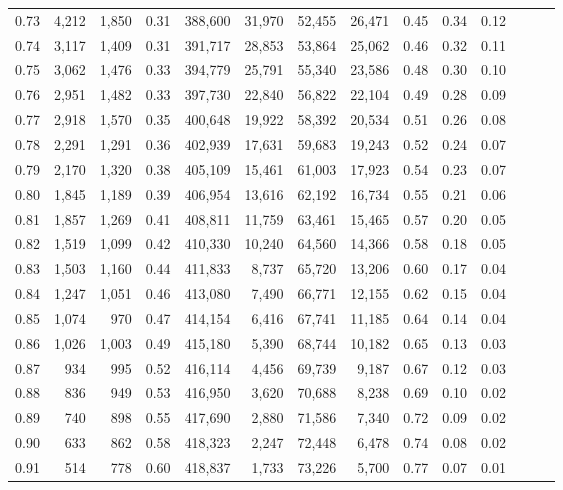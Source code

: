 \begin{tabular}{rrrrrrrrrrrrrr}
0.73 &  4,212 &  1,850 &  0.31 &  388,600 &   31,970 &  52,455 &  26,471 &  0.45 &  0.34 &      0.12 \\
0.74 &  3,117 &  1,409 &  0.31 &  391,717 &   28,853 &  53,864 &  25,062 &  0.46 &  0.32 &      0.11 \\
0.75 &  3,062 &  1,476 &  0.33 &  394,779 &   25,791 &  55,340 &  23,586 &  0.48 &  0.30 &      0.10 \\
0.76 &  2,951 &  1,482 &  0.33 &  397,730 &   22,840 &  56,822 &  22,104 &  0.49 &  0.28 &      0.09 \\
0.77 &  2,918 &  1,570 &  0.35 &  400,648 &   19,922 &  58,392 &  20,534 &  0.51 &  0.26 &      0.08 \\
0.78 &  2,291 &  1,291 &  0.36 &  402,939 &   17,631 &  59,683 &  19,243 &  0.52 &  0.24 &      0.07 \\
0.79 &  2,170 &  1,320 &  0.38 &  405,109 &   15,461 &  61,003 &  17,923 &  0.54 &  0.23 &      0.07 \\
0.80 &  1,845 &  1,189 &  0.39 &  406,954 &   13,616 &  62,192 &  16,734 &  0.55 &  0.21 &      0.06 \\
0.81 &  1,857 &  1,269 &  0.41 &  408,811 &   11,759 &  63,461 &  15,465 &  0.57 &  0.20 &      0.05 \\
0.82 &  1,519 &  1,099 &  0.42 &  410,330 &   10,240 &  64,560 &  14,366 &  0.58 &  0.18 &      0.05 \\
0.83 &  1,503 &  1,160 &  0.44 &  411,833 &    8,737 &  65,720 &  13,206 &  0.60 &  0.17 &      0.04 \\
0.84 &  1,247 &  1,051 &  0.46 &  413,080 &    7,490 &  66,771 &  12,155 &  0.62 &  0.15 &      0.04 \\
0.85 &  1,074 &    970 &  0.47 &  414,154 &    6,416 &  67,741 &  11,185 &  0.64 &  0.14 &      0.04 \\
0.86 &  1,026 &  1,003 &  0.49 &  415,180 &    5,390 &  68,744 &  10,182 &  0.65 &  0.13 &      0.03 \\
0.87 &    934 &    995 &  0.52 &  416,114 &    4,456 &  69,739 &   9,187 &  0.67 &  0.12 &      0.03 \\
0.88 &    836 &    949 &  0.53 &  416,950 &    3,620 &  70,688 &   8,238 &  0.69 &  0.10 &      0.02 \\
0.89 &    740 &    898 &  0.55 &  417,690 &    2,880 &  71,586 &   7,340 &  0.72 &  0.09 &      0.02 \\
0.90 &    633 &    862 &  0.58 &  418,323 &    2,247 &  72,448 &   6,478 &  0.74 &  0.08 &      0.02 \\
0.91 &    514 &    778 &  0.60 &  418,837 &    1,733 &  73,226 &   5,700 &  0.77 &  0.07 &      0.01 \\

\end{tabular}
